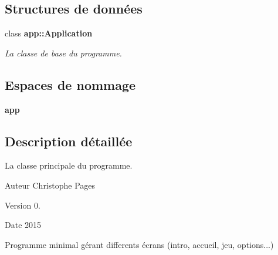 \subsection*{Structures de données}
\begin{DoxyCompactItemize}
\item 
class {\bf app\+::\+Application}
\begin{DoxyCompactList}\small\item\em La classe de base du programme. \end{DoxyCompactList}\end{DoxyCompactItemize}
\subsection*{Espaces de nommage}
\begin{DoxyCompactItemize}
\item 
 {\bf app}
\end{DoxyCompactItemize}


\subsection{Description détaillée}
La classe principale du programme. 

\begin{DoxyAuthor}{Auteur}
Christophe Pages 
\end{DoxyAuthor}
\begin{DoxyVersion}{Version}
0. 
\end{DoxyVersion}
\begin{DoxyDate}{Date}
2015
\end{DoxyDate}
Programme minimal gérant differents écrans (intro, accueil, jeu, options...) 